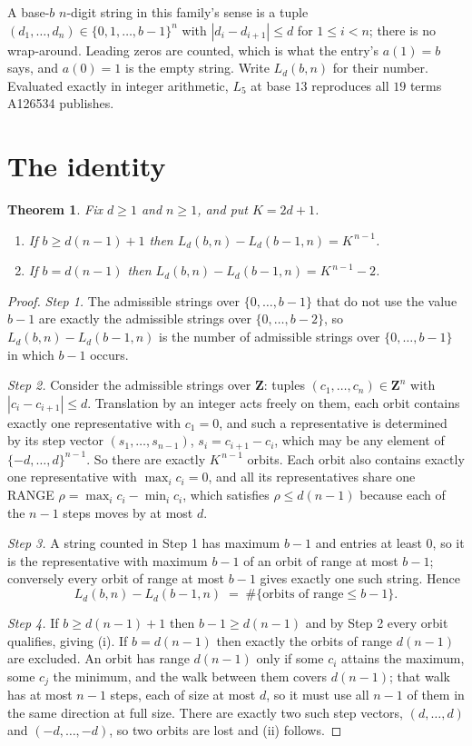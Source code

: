 \documentclass[11pt,a4paper]{article}
\theoremstyle{plain}
\newtheorem{theorem}{Theorem}
\theoremstyle{definition}
\begin{document}
A base-$b$ $n$-digit string in this family's sense is a tuple
$(d_1,\dots,d_n)\in\{0,1,\dots,b-1\}^{n}$ with $|d_i-d_{i+1}|\le d$ for $1\le i<n$; there
is no wrap-around. Leading zeros are counted, which is what the entry's $a(1)=b$ says, and
$a(0)=1$ is the empty string. Write $L_d(b,n)$ for their number. Evaluated exactly in integer
arithmetic, $L_{5}$ at base $13$ reproduces all $19$ terms A126534 publishes.

\section{The identity}

\begin{theorem}
Fix $d\ge1$ and $n\ge1$, and put $K=2d+1$.
\begin{enumerate}
\item[(i)] If $b\ge d(n-1)+1$ then $L_d(b,n)-L_d(b-1,n)=K^{\,n-1}$.
\item[(ii)] If $b=d(n-1)$ then $L_d(b,n)-L_d(b-1,n)=K^{\,n-1}-2$.
\end{enumerate}
\end{theorem}

\begin{proof}
\emph{Step 1.} The admissible strings over $\{0,\dots,b-1\}$ that do not use the value $b-1$
are exactly the admissible strings over $\{0,\dots,b-2\}$, so $L_d(b,n)-L_d(b-1,n)$ is the
number of admissible strings over $\{0,\dots,b-1\}$ in which $b-1$ occurs.

\emph{Step 2.} Consider the admissible strings over $\mathbf{Z}$: tuples
$(c_1,\dots,c_n)\in\mathbf{Z}^{n}$ with $|c_i-c_{i+1}|\le d$. Translation by an integer acts
freely on them, each orbit contains exactly one representative with $c_1=0$, and such a
representative is determined by its step vector $(s_1,\dots,s_{n-1})$, $s_i=c_{i+1}-c_i$,
which may be any element of $\{-d,\dots,d\}^{n-1}$. So there are exactly $K^{\,n-1}$ orbits.
Each orbit also contains exactly one representative with $\max_i c_i=0$, and all its
representatives share one RANGE $\rho=\max_ic_i-\min_ic_i$, which satisfies
$\rho\le d(n-1)$ because each of the $n-1$ steps moves by at most $d$.

\emph{Step 3.} A string counted in Step 1 has maximum $b-1$ and entries at least $0$, so it is
the representative with maximum $b-1$ of an orbit of range at most $b-1$; conversely every orbit
of range at most $b-1$ gives exactly one such string. Hence
\[
L_d(b,n)-L_d(b-1,n)\;=\;\#\{\text{orbits of range}\le b-1\} .
\]

\emph{Step 4.} If $b\ge d(n-1)+1$ then $b-1\ge d(n-1)$ and by Step 2 every orbit qualifies,
giving (i). If $b=d(n-1)$ then exactly the orbits of range $d(n-1)$ are excluded. An orbit has
range $d(n-1)$ only if some $c_i$ attains the maximum, some $c_j$ the minimum, and the walk
between them covers $d(n-1)$; that walk has at most $n-1$ steps, each of size at most $d$, so it
must use all $n-1$ of them in the same direction at full size. There are exactly two such step
vectors, $(d,\dots,d)$ and $(-d,\dots,-d)$, so two orbits are lost and (ii) follows.
\end{proof}
\end{document}
